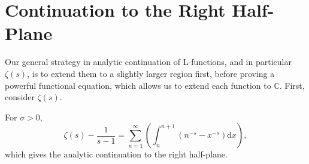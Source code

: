 \section{Continuation to the Right Half-Plane}
Our general strategy in analytic continuation of L-functions, and in particular $\zeta(s)$, is to extend them to a slightly larger region first, before proving a powerful functional equation, which allows us to extend each function to $\mathbb{C}$.
First, consider $\zeta(s)$.
\begin{proposition}
For $\sigma > 0$,
\begin{equation}
\label{righthalfplanecontinuation}
\zeta(s) - \frac{1}{s-1} = \sum_{n=1}^{\infty} \left(\int_{n}^{n+1} (n^{-s} - x^{-s}) \mathrm{d}x \right),
\end{equation}
which gives the analytic continuation to the right half-plane.
\end{proposition}
